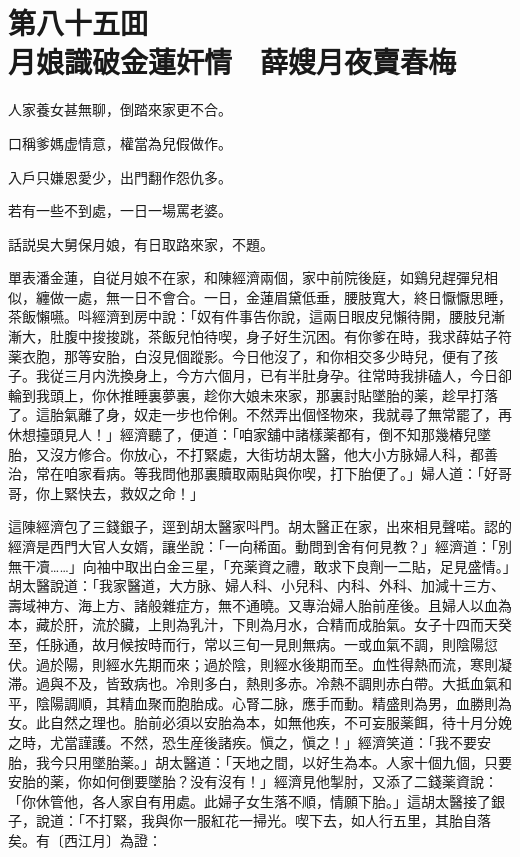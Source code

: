 
\chapter*{第八十五囬　\\月娘識破金蓮奸情　薛嫂月夜賣春梅}


\begin{myquote}
人家養女甚無聊，倒踏來家更不合。

口稱爹媽虚情意，權當為兒假做作。

入戶只嫌恩愛少，出門翻作怨仇多。

若有一些不到處，一日一場罵老婆。
\end{myquote}

話説吳大舅保月娘，有日取路來家，不題。

單表潘金蓮，自従月娘不在家，和陳經濟兩個，家中前院後庭，如鷄兒趕彈兒相似，纏做一處，無一日不會合。一日，金蓮眉黛低垂，腰肢寬大，終日懨懨思睡，茶飯懶嚥。呌經濟到房中說：「奴有件事告你說，這兩日眼皮兒懶待開，腰肢兒漸漸大，肚腹中捘捘跳，茶飯兒怕待喫，身子好生沉困。有你爹在時，我求薛姑子符薬衣胞，那等安胎，白沒見個蹤影。今日他沒了，和你相交多少時兒，便有了孩子。我従三月内洗換身上，今方六個月，已有半肚身孕。往常時我排磕人，今日卻輪到我頭上，你休推睡裏夢裏，趁你大娘未來家，那裏討貼墜胎的薬，趁早打落了。這胎氣離了身，奴走一步也伶俐。不然弄出個怪物來，我就尋了無常罷了，再休想擡頭見人！」經濟聽了，便道：「咱家舖中諸樣薬都有，倒不知那幾樁兒墜胎，又沒方修合。你放心，不打緊處，大街坊胡太醫，他大小方脉婦人科，都善治，常在咱家看病。等我問他那裏贖取兩貼與你喫，打下胎便了。」婦人道：「好哥哥，你上緊快去，救奴之命！」

這陳經濟包了三錢銀子，逕到胡太醫家呌門。胡太醫正在家，出來相見聲喏。認的經濟是西門大官人女婿，讓坐說：「一向稀面。動問到舍有何見教？」經濟道：「別無干凟……」向袖中取出白金三星，「充薬資之禮，敢求下良劑一二貼，足見盛情。」胡太醫說道：「我家醫道，大方脉、婦人科、小兒科、内科、外科、加減十三方、壽域神方、海上方、諸般雜症方，無不通曉。又專治婦人胎前産後。且婦人以血為本，藏於肝，流於臟，上則為乳汁，下則為月水，合精而成胎氣。女子十四而天癸至，任脉通，故月候按時而行，常以三旬一見則無病。一或血氣不調，則陰陽愆伏。過於陽，則經水先期而來；過於陰，則經水後期而至。血性得熱而流，寒則凝滞。過與不及，皆致病也。冷則多白，熱則多赤。冷熱不調則赤白帶。大抵血氣和平，陰陽調順，其精血聚而胞胎成。心腎二脉，應手而動。精盛則為男，血勝則為女。此自然之理也。胎前必須以安胎為本，如無他疾，不可妄服薬餌，待十月分娩之時，尤當謹護。不然，恐生産後諸疾。愼之，愼之！」經濟笑道：「我不要安胎，我今只用墜胎薬。」胡太醫道：「天地之間，以好生為本。人家十個九個，只要安胎的薬，你如何倒要墜胎？没有沒有！」經濟見他掣肘，又添了二錢薬資說：「你休管他，各人家自有用處。此婦子女生落不順，情願下胎。」這胡太醫接了銀子，說道：「不打緊，我與你一服紅花一掃光。喫下去，如人行五里，其胎自落矣。有〔西江月〕為證：

